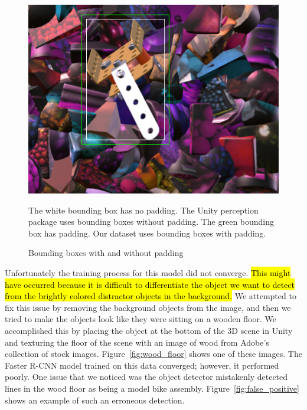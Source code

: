 \begin{figure}
  \includegraphics[width=\columnwidth]{figures/synthetic/padding.png}
  \begin{captiontext}
    The white bounding box has no padding.
    The Unity perception package uses bounding boxes without padding.
    The green bounding box has padding.
    Our dataset uses bounding boxes with padding.
  \end{captiontext}
  \caption{
    Bounding boxes with and without padding
  }\label{fig:padding}
\end{figure}

Unfortunately the training process for this model did not converge.
\hl{This might have occurred because it is difficult to differentiate the
  object we want to detect from the brightly colored distractor objects in the
  background.}
We attempted to fix this issue by removing the background objects from the
image, and then we tried to make the objects look like they were sitting on a
wooden floor.
We accomplished this by placing the object at the bottom of the 3D scene in
Unity and texturing the floor of the scene with an image of wood from Adobe's
collection of stock images.
Figure~\ref{fig:wood_floor} shows one of these images.
The Faster R-CNN model trained on this data converged; however, it performed
poorly.
One issue that we noticed was the object detector mistakenly detected lines
in the wood floor as being a model bike assembly.
Figure~\ref{fig:false_positive} shows an example of such an erroneous detection.

